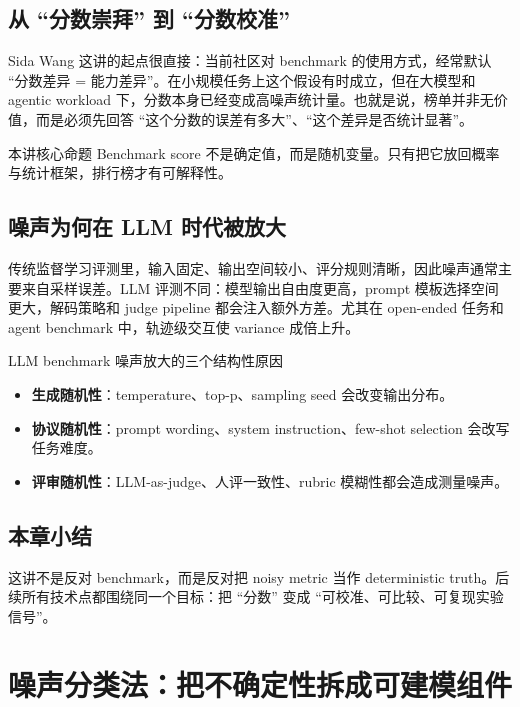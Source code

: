 \documentclass[a4paper]{article}
\begin{document}
\subsection{从 ``分数崇拜'' 到 ``分数校准''}
Sida Wang 这讲的起点很直接：当前社区对 benchmark 的使用方式，经常默认 ``分数差异 = 能力差异''。在小规模任务上这个假设有时成立，但在大模型和 agentic workload 下，分数本身已经变成高噪声统计量。也就是说，榜单并非无价值，而是必须先回答 ``这个分数的误差有多大''、``这个差异是否统计显著''。

\begin{importantbox}{本讲核心命题}
Benchmark score 不是确定值，而是随机变量。只有把它放回概率与统计框架，排行榜才有可解释性。
\end{importantbox}

\subsection{噪声为何在 LLM 时代被放大}
传统监督学习评测里，输入固定、输出空间较小、评分规则清晰，因此噪声通常主要来自采样误差。LLM 评测不同：模型输出自由度更高，prompt 模板选择空间更大，解码策略和 judge pipeline 都会注入额外方差。尤其在 open-ended 任务和 agent benchmark 中，轨迹级交互使 variance 成倍上升。

\begin{knowledgebox}{LLM benchmark 噪声放大的三个结构性原因}
\begin{itemize}
    \item \textbf{生成随机性}：temperature、top-p、sampling seed 会改变输出分布。
    \item \textbf{协议随机性}：prompt wording、system instruction、few-shot selection 会改写任务难度。
    \item \textbf{评审随机性}：LLM-as-judge、人评一致性、rubric 模糊性都会造成测量噪声。
\end{itemize}
\end{knowledgebox}

\subsection{本章小结}
这讲不是反对 benchmark，而是反对把 noisy metric 当作 deterministic truth。后续所有技术点都围绕同一个目标：把 ``分数'' 变成 ``可校准、可比较、可复现实验信号''。

\section{噪声分类法：把不确定性拆成可建模组件}
\end{document}
